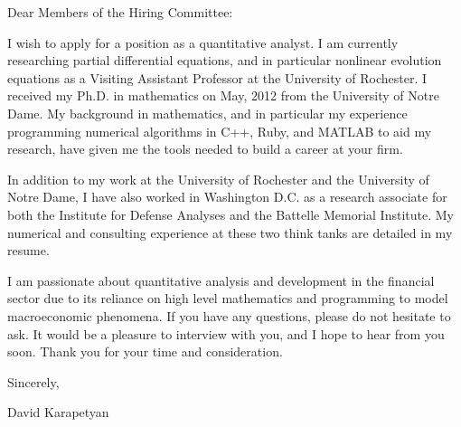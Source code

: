 Dear Members of the Hiring Committee:

I wish to apply for a position as a quantitative analyst. I am currently researching partial differential equations, and in particular nonlinear evolution equations as a Visiting Assistant Professor at the University of Rochester. I received my Ph.D. in mathematics on May, 2012 from the University of Notre Dame. My
background in mathematics, and in particular my experience
programming numerical algorithms in C++, Ruby, and MATLAB
to aid my research, have given me the tools needed to build a career at your firm.

In addition to my work at the University of Rochester and the University of Notre Dame, I have also worked in Washington D.C. as a research
associate for both the Institute for Defense Analyses and the Battelle Memorial
Institute. My numerical and consulting experience at these two think tanks are
detailed in my resume. 

I am passionate about quantitative analysis and development in the financial
sector due to its reliance on high level mathematics and programming to model
macroeconomic phenomena. If you have any questions, please do not hesitate to
ask. It would be a pleasure to interview with you, and I hope to hear from you
soon. Thank you for your time and consideration. 

Sincerely,

David Karapetyan
